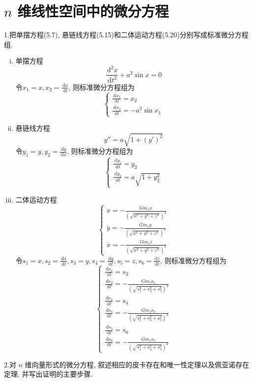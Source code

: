 \documentclass[titlepage,11pt,a4paper,twoside]{report}
\makeatletter
\newcommand\diff{\,\mathrm{d}}
\newenvironment{solve}{\par
	\pushQED{\qed}%
	\normalfont \topsep1\p@\@plus6\p@\relax
	\trivlist
	\item\relax
	{\hspace*{\parindent}{\heiti 解}\@addpunct{:}}\hspace\labelsep\ignorespaces
}{%
	\popQED\endtrivlist\@endpefalse
}
\makeatother
\begin{document}
\section{$n$ 维线性空间中的微分方程}
1.把单摆方程(5.7), 悬链线方程(5.15)和二体运动方程(5.20)分别写成标准微分方程组.
\begin{solve} 
\begin{enumerate}[(i)]
\item 单摆方程\[\frac{\diff^2x}{\diff t^2}+a^2\sin x=0\]
令$x_1=x,x_2=\frac{\diff x}{\diff t}$, 则标准微分方程组为
\[\begin{cases}
\frac{\diff x_1}{\diff t}=x_2\\\frac{\diff x_2}{\diff t}=-a^2\sin x_1
\end{cases}\]
\item 悬链线方程\[y''=a\sqrt{1+(y')^2}\]
令$y_1=y,y_2=\frac{\diff y}{\diff x}$, 则标准微分方程组为
\[\begin{cases}
\frac{\diff y_1}{\diff t}=y_2\\\frac{\diff y_2}{\diff t}=a\sqrt{1+y_2^2}
\end{cases}\]
\item 二体运动方程
\[\begin{cases}
\ddot{x}=-\frac{Gm_sx}{(\sqrt{x^2+y^2+z^2})^3}\\
\ddot{y}=-\frac{Gm_sy}{(\sqrt{x^2+y^2+z^2})^3}\\
\ddot{x}=-\frac{Gm_sz}{(\sqrt{x^2+y^2+z^2})^3}
\end{cases}\]
令$s_1=x,s_2=\frac{\diff x}{\diff t},s_3=y,s_4=\frac{\diff y}{\diff t},s_5=z,s_6=\frac{\diff z}{\diff t}$, 则标准微分方程组为
\[\begin{cases}
\frac{\diff s_1}{\diff t}=s_2\\
\frac{\diff s_2}{\diff t}=-\frac{Gm_ss_1}{(\sqrt{s_1^2+s_3^2+s_5^2})^3}\\
\frac{\diff s_3}{\diff t}=s_4\\
\frac{\diff s_4}{\diff t}=-\frac{Gm_ss_3}{(\sqrt{s_1^2+s_3^2+s_5^2})^3}\\
\frac{\diff s_5}{\diff t}=s_6\\
\frac{\diff s_6}{\diff t}=-\frac{Gm_ss_5}{(\sqrt{s_1^2+s_3^2+s_5^2})^3}
\end{cases}\]
\end{enumerate}
\end{solve}
2.对 $n$ 维向量形式的微分方程, 叙述相应的皮卡存在和唯一性定理以及佩亚诺存在定理, 并写出证明的主要步骤.
\end{document}
